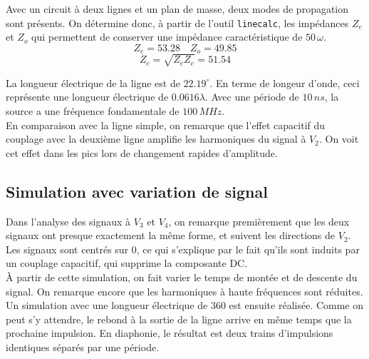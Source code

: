 Avec un circuit à deux lignes et un plan de masse, deux modes de propagation sont présents. On détermine donc, à partir de l'outil \texttt{linecalc}, les impédances $Z_e$ et $Z_o$ qui permettent de conserver une impédance caractéristique de $50\,\omega$.
\[Z_e = 53.28\quad Z_o = 49.85\]
\[Z_c = \sqrt{Z_eZ_c} = 51.54\]

La longueur électrique de la ligne est de $22.19^\circ$. En terme de longeur d'onde, ceci représente une longueur électrique de $0.0616\lambda$. Avec une période de $10\,ns$, la source a une fréquence fondamentale de $100\,MHz$. 
\\
En comparaison avec la ligne simple, on remarque que l'effet capacitif du couplage avec la deuxième ligne amplifie les harmoniques du signal à $V_2$. On voit cet effet dans les pics lors de changement rapides d'amplitude.


\subsection{Simulation avec variation de signal}
Dans l'analyse des signaux à $V_3$ et $V_4$, on remarque premièrement que les deux signaux ont presque exactement la même forme, et suivent les directions de $V_2$. Les signaux sont centrés sur 0, ce qui s'explique par le fait qu'ils sont induits par un couplage capacitif, qui supprime la composante DC. 
\\
À partir de cette simulation, on fait varier le temps de montée et de descente du signal. On remarque encore que les harmoniques à haute fréquences sont réduites. 
\\
Un simulation avec une longueur électrique de 360 est ensuite réalisée. Comme on peut s'y attendre, le rebond à la sortie de la ligne arrive en même temps que la prochaine impulsion. En diaphonie, le résultat est deux trains d'impulsions identiques séparés par une période.

\vspace{0.3cm}
\vspace{0.3cm}

